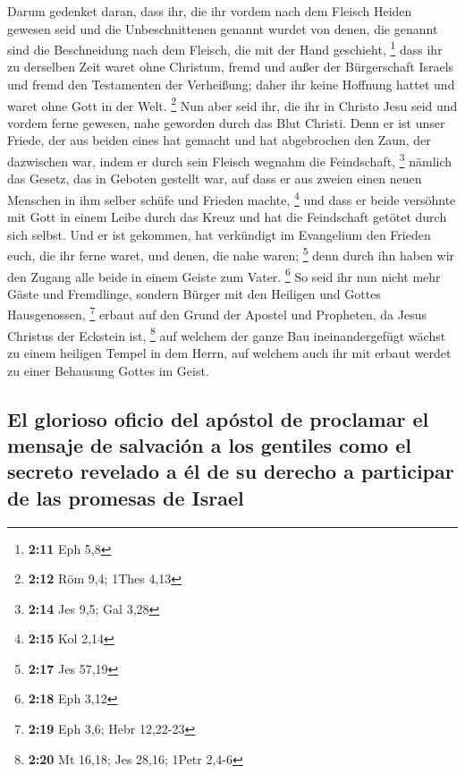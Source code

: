  Darum gedenket daran, dass ihr, die ihr vordem nach dem
Fleisch Heiden gewesen seid und die Unbeschnittenen genannt wurdet von
denen, die genannt sind die Beschneidung nach dem Fleisch, die mit der
Hand geschieht, \footnote{\textbf{2:11} Eph 5,8}  dass
ihr zu derselben Zeit waret ohne Christum, fremd und außer der
Bürgerschaft Israels und fremd den Testamenten der Verheißung; daher ihr
keine Hoffnung hattet und waret ohne Gott in der Welt. \footnote{\textbf{2:12}
  Röm 9,4; 1Thes 4,13}  Nun aber seid ihr, die ihr in
Christo Jesu seid und vordem ferne gewesen, nahe geworden durch das Blut
Christi.  Denn er ist unser Friede, der aus beiden eines
hat gemacht und hat abgebrochen den Zaun, der dazwischen war, indem er
durch sein Fleisch wegnahm die Feindschaft, \footnote{\textbf{2:14} Jes
  9,5; Gal 3,28}  nämlich das Gesetz, das in Geboten
gestellt war, auf dass er aus zweien einen neuen Menschen in ihm selber
schüfe und Frieden machte, \footnote{\textbf{2:15} Kol 2,14}
 und dass er beide versöhnte mit Gott in einem Leibe
durch das Kreuz und hat die Feindschaft getötet durch sich selbst.
 Und er ist gekommen, hat verkündigt im Evangelium den
Frieden euch, die ihr ferne waret, und denen, die nahe waren;
\footnote{\textbf{2:17} Jes 57,19}  denn durch ihn haben
wir den Zugang alle beide in einem Geiste zum Vater. \footnote{\textbf{2:18}
  Eph 3,12}  So seid ihr nun nicht mehr Gäste und
Fremdlinge, sondern Bürger mit den Heiligen und Gottes Hausgenossen,
\footnote{\textbf{2:19} Eph 3,6; Hebr 12,22-23}  erbaut
auf den Grund der Apostel und Propheten, da Jesus Christus der Eckstein
ist, \footnote{\textbf{2:20} Mt 16,18; Jes 28,16; 1Petr 2,4-6}
 auf welchem der ganze Bau ineinandergefügt wächst zu
einem heiligen Tempel in dem Herrn,  auf welchem auch ihr
mit erbaut werdet zu einer Behausung Gottes im Geist.

\hypertarget{el-glorioso-oficio-del-apuxf3stol-de-proclamar-el-mensaje-de-salvaciuxf3n-a-los-gentiles-como-el-secreto-revelado-a-uxe9l-de-su-derecho-a-participar-de-las-promesas-de-israel}{%
\subsection{El glorioso oficio del apóstol de proclamar el mensaje de
salvación a los gentiles como el secreto revelado a él de su derecho a
participar de las promesas de
Israel}\label{el-glorioso-oficio-del-apuxf3stol-de-proclamar-el-mensaje-de-salvaciuxf3n-a-los-gentiles-como-el-secreto-revelado-a-uxe9l-de-su-derecho-a-participar-de-las-promesas-de-israel}}


